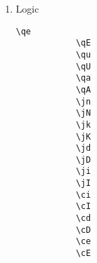 \documentclass[10pt, a4paper]{article}
\begin{document}
\begin{enumerate}
\begin{center}
\begin{minipage}[h][7cm][t]{15em}
\begin{lstlisting}[style=B]
			\mx
			\mX
			\my
			\mY
			\mz
			\mZ
			\mi
			\mI
			\ms
			\mS
			\mr
			\mR
			\mp
			\mP
			\mq
			\mQ
				\end{lstlisting}
			\end{minipage}
			\begin{minipage}[h][7cm][t]{15em}
				\begin{fgls}
					\ \\
					\mx\\
					\mX\\
					\my\\
					\mY\\
					\mz\\
					\mZ\\
					\mi\\
					\mI\\
					\ms\\
					\mS\\
					\mr\\
					\mR\\
					\mp\\
					\mP\\
					\mq\\
					\mQ
				\end{fgls}
			\end{minipage}
		\end{center}
		\newpage
		\item Logic \begin{center}
			\begin{minipage}[h][8.6cm][t]{15em}
				\begin{lstlisting}[style=B]
			\qe
			\qE
			\qu
			\qU
			\qa
			\qA
			\jn
			\jN
			\jk
			\jK
			\jd
			\jD
			\ji
			\jI
			\ci
			\cI
			\cd
			\cD
			\ce
			\cE
				\end{lstlisting}
			\end{minipage}
			\begin{minipage}[h][8.6cm][t]{15em}
				\begin{fgls}
					\ \\
					\qe\\
					\qE\\
					\qu\\
					\qU\\
					\qa\\
					\qA\\
					\jn\\
					\jN\\
					\jk\\
					\jK\\
					\jd\\

\end{fgls}
\end{minipage}
\end{center}
\end{enumerate}
\end{document}
